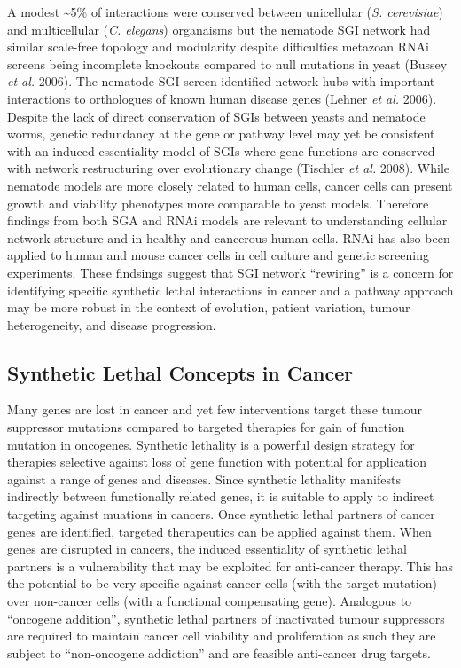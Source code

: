 A modest \~{}5\% of interactions were conserved between unicellular (\textit{S. cerevisiae}) and multicellular (\textit{C. elegans}) organaisms but the nematode SGI network had similar scale-free topology and modularity despite difficulties metazoan RNAi screens being incomplete knockouts compared to null mutations in yeast (Bussey\textit{ et al.} 2006). The nematode SGI screen identified network hubs with important interactions to orthologues of known human disease genes (Lehner\textit{ et al.} 2006). Despite the lack of direct conservation of SGIs between yeasts and nematode worms, genetic redundancy at the gene or pathway level may yet be consistent with an induced essentiality model of SGIs where gene functions are conserved with network restructuring over evolutionary change (Tischler\textit{ et al.} 2008). While nematode models are more closely related to human cells, cancer cells can present growth and viability phenotypes more comparable to yeast models. Therefore findings from both SGA and RNAi models are relevant to understanding cellular network structure and in healthy and cancerous human cells. RNAi has also been applied to human and mouse cancer cells in cell culture and genetic screening experiments. These findsings suggest that SGI network ``rewiring'' is a concern for identifying specific synthetic lethal interactions in cancer and a pathway approach may be more robust in the context of evolution, patient variation, tumour heterogeneity, and disease progression.  

\subsection{Synthetic Lethal Concepts in Cancer}

Many genes are lost in cancer and yet few interventions target these tumour suppressor mutations compared to targeted therapies for gain of function mutation in oncogenes. Synthetic lethality is a powerful design strategy for therapies selective against loss of gene function with potential for application against a range of genes and diseases. Since synthetic lethality manifests indirectly between functionally related genes, it is suitable to apply to indirect targeting against muations in cancers. Once synthetic lethal partners of cancer genes are identified, targeted therapeutics can be applied against them. When genes are disrupted in cancers, the induced essentiality of synthetic lethal partners is a vulnerability that may be exploited for anti-cancer therapy. This has the potential to be very specific against cancer cells (with the target mutation) over non-cancer cells (with a functional compensating gene). Analogous to ``oncogene addition'', synthetic lethal partners of inactivated tumour suppressors are required to maintain cancer cell viability and proliferation as such they are subject to ``non-oncogene addiction'' and are feasible anti-cancer drug targets. 


